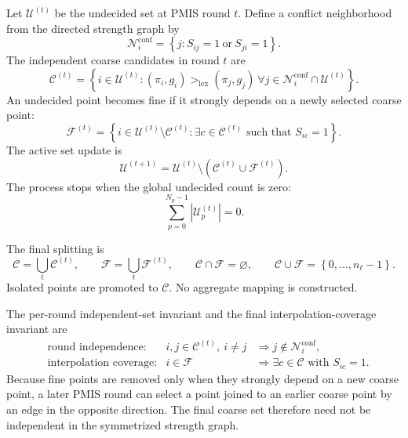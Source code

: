 \documentclass[11pt]{article}
\newcommand{\abs}[1]{\left\lvert #1 \right\rvert}
\newcommand{\set}[1]{\left\{ #1 \right\}}
\newcommand{\level}{\ell}
\begin{document}
Let $\mathcal U^{(t)}$ be the undecided set at PMIS round $t$.  Define a
conflict neighborhood from the directed strength graph by
\begin{equation}
  \mathcal N_i^{\mathrm{conf}}
  =
  \set{j:S_{ij}=1\ \text{or}\ S_{ji}=1}.
  \label{eq:conflict-neighborhood}
\end{equation}
The independent coarse candidates in round $t$ are
\begin{equation}
  \mathcal C^{(t)}
  =
  \set{
    i\in\mathcal U^{(t)}:
    (\pi_i,g_i)>_{\mathrm{lex}}(\pi_j,g_j)
    \ \forall j\in
    \mathcal N_i^{\mathrm{conf}}\cap\mathcal U^{(t)}
  }.
  \label{eq:round-coarse-set}
\end{equation}
An undecided point becomes fine if it strongly depends on a newly selected
coarse point:
\begin{equation}
  \mathcal F^{(t)}
  =
  \set{
    i\in\mathcal U^{(t)}\setminus\mathcal C^{(t)}:
    \exists c\in\mathcal C^{(t)}
    \text{ such that }S_{ic}=1
  }.
  \label{eq:round-fine-set}
\end{equation}
The active set update is
\begin{equation}
  \mathcal U^{(t+1)}
  =
  \mathcal U^{(t)}
  \setminus
  \left(\mathcal C^{(t)}\cup\mathcal F^{(t)}\right).
  \label{eq:active-set-update}
\end{equation}
The process stops when the global undecided count is zero:
\begin{equation}
  \sum_{p=0}^{N_p-1}
  \abs{\mathcal U_p^{(t)}}=0.
  \label{eq:pmis-termination}
\end{equation}

The final splitting is
\begin{equation}
  \mathcal C=\bigcup_t\mathcal C^{(t)},
  \qquad
  \mathcal F=\bigcup_t\mathcal F^{(t)},
  \qquad
  \mathcal C\cap\mathcal F=\varnothing,
  \qquad
  \mathcal C\cup\mathcal F=\set{0,\ldots,n_\level-1}.
  \label{eq:final-splitting}
\end{equation}
Isolated points are promoted to $\mathcal C$.  No aggregate mapping is
constructed.

The per-round independent-set invariant and the final interpolation-coverage
invariant are
\begin{align}
  &\text{round independence:}
  & i,j\in\mathcal C^{(t)},\ i\neq j
  &\Longrightarrow
  j\notin\mathcal N_i^{\mathrm{conf}},
  \label{eq:round-coarse-independence}\\
  &\text{interpolation coverage:}
  & i\in\mathcal F
  &\Longrightarrow
  \exists c\in\mathcal C\text{ with }S_{ic}=1.
  \label{eq:fine-coverage}
\end{align}
Because fine points are removed only when they strongly depend on a new coarse
point, a later PMIS round can select a point joined to an earlier coarse point
by an edge in the opposite direction.  The final coarse set therefore need
not be independent in the symmetrized strength graph.
\end{document}

